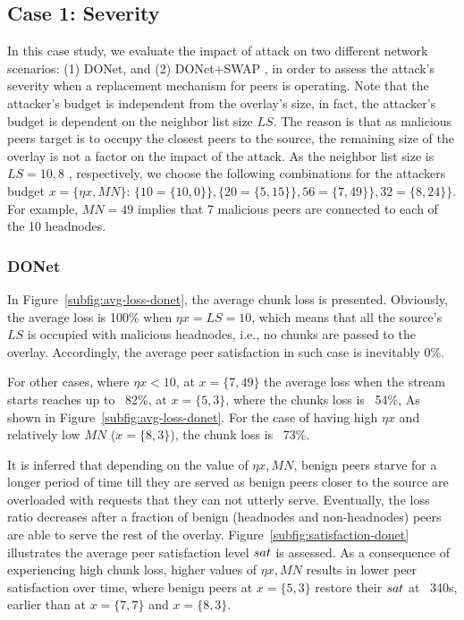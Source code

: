 \subsection{Case 1: \drop Severity}

In this case study, we evaluate the impact of \drop attack on two different network scenarios:  (1) DONet, and (2) DONet+SWAP \cite{nguyen2016swap}, in order to assess the attack's severity when a replacement mechanism for peers is operating.
Note that the attacker's budget is independent from the overlay's size, in fact, the attacker's budget is dependent on the neighbor list size $LS$.
The reason is that as malicious peers target is to occupy the closest peers to the source, the remaining size of the overlay is not a factor on the impact of the \drop attack.
As the neighbor list size is $LS=10,8$ , respectively, we choose the following combinations for the attackers budget $x={\{\eta x, MN\}}$: $\{10=\{10,0\}\}, \{20=\{5,15\}\}, 56=\{7,49\}\}, 32=\{8,24\}\}$.
For example, $MN=49$ implies that 7 malicious peers are connected to each of the 10 headnodes.

\subsubsection{DONet}
In Figure~\ref{subfig:avg-loss-donet}, the average chunk loss is presented. 
Obviously, the average loss is 100\% when $\eta x= LS =10$, which means that all the source's $LS$ is occupied with malicious headnodes, i.e., no chunks are passed to the overlay.
Accordingly, the average peer satisfaction in such case is inevitably 0\%. 

For other cases, where $\eta x < 10$, at $x=\{7, 49\}$ the average loss when the stream starts reaches up to ~82\%, at $x=\{5, 3\}$, where the chunks loss is ~54\%, As shown in Figure~\ref{subfig:avg-loss-donet}.
For the case of having high $\eta x$ and relatively low $MN$ ($x=\{8, 3\}$), the chunk loss is ~73\%.

It is inferred that depending on the value of $\eta x, MN$, benign peers starve for a longer period of time till they are served as benign peers closer to the source are overloaded with requests that they can not utterly serve. 
Eventually, the loss ratio decreases after a fraction of benign (headnodes and non-headnodes) peers are able to serve the rest of the overlay.
Figure~\ref{subfig:satisfaction-donet} illustrates the average peer satisfaction level $sat$ is assessed.
As a consequence of experiencing high chunk loss, higher values of $\eta x, MN$ results in lower peer satisfaction over time, where benign peers at $x=\{5, 3\}$ restore their $sat$ at ~340s, earlier than at $x=\{7, 7\}$ and $x=\{8, 3\}$.

